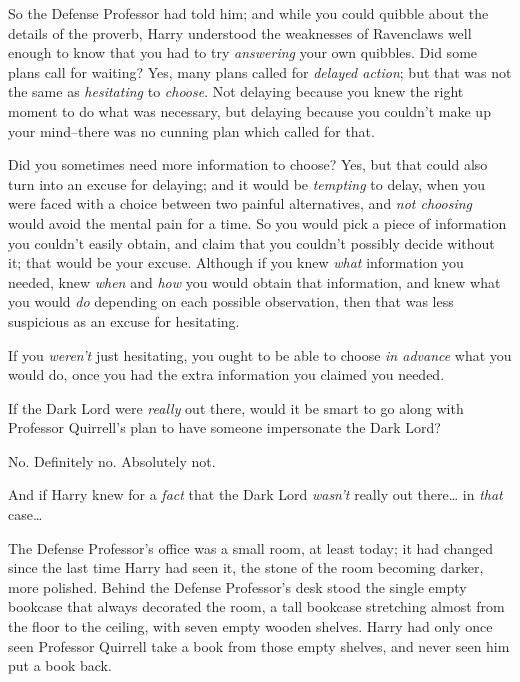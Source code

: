 
 

\hplettrineextrapara
So the Defense Professor had told him; and while you could quibble about the details of the proverb, Harry understood the weaknesses of Ravenclaws well enough to know that you had to try \emph{answering} your own quibbles. Did some plans call for waiting? Yes, many plans called for \emph{delayed action}; but that was not the same as \emph{hesitating} to \emph{choose}. Not delaying because you knew the right moment to do what was necessary, but delaying because you couldn't make up your mind\---there was no cunning plan which called for that.

Did you sometimes need more information to choose? Yes, but that could also turn into an excuse for delaying; and it would be \emph{tempting} to delay, when you were faced with a choice between two painful alternatives, and \emph{not choosing} would avoid the mental pain for a time. So you would pick a piece of information you couldn't easily obtain, and claim that you couldn't possibly decide without it; that would be your excuse. Although if you knew \emph{what} information you needed, knew \emph{when} and \emph{how} you would obtain that information, and knew what you would \emph{do} depending on each possible observation, then that was less suspicious as an excuse for hesitating.

If you \emph{weren't} just hesitating, you ought to be able to choose \emph{in advance} what you would do, once you had the extra information you claimed you needed.

If the Dark Lord were \emph{really} out there, would it be smart to go along with Professor Quirrell's plan to have someone impersonate the Dark Lord?

No. Definitely no. Absolutely not.

And if Harry knew for a \emph{fact} that the Dark Lord \emph{wasn't} really out there{\ldots} in \emph{that} case{\ldots}

The Defense Professor's office was a small room, at least today; it had changed since the last time Harry had seen it, the stone of the room becoming darker, more polished. Behind the Defense Professor's desk stood the single empty bookcase that always decorated the room, a tall bookcase stretching almost from the floor to the ceiling, with seven empty wooden shelves. Harry had only once seen Professor Quirrell take a book from those empty shelves, and never seen him put a book back.

